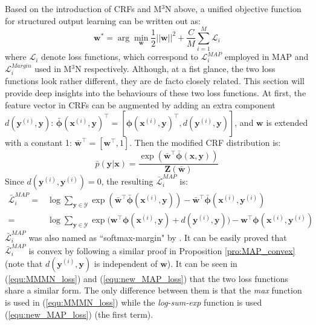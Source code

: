 Based on the introduction of CRFs and M$^3$N above, a unified objective function for structured output learning  can be written out as:  
\begin{equation} 
        \mathbf{w}^* = \arg\min_{\mathbf{w}} \frac{1}{2} ||\mathbf{w}||^2+  \frac{C}{M}\sum_{i=1}^M \mathcal{L}_i 
    \label{equ:unify}
\end{equation} 
where $\mathcal{L}_i$ denote loss functions, which correspond to $\mathcal{L}^{MAP}_i$  employed in MAP and $\mathcal{L}^{Margin}_i$ used 
in M$^3$N respectively.      
Although, at a fist glance, the two loss functions look rather different, they are de facto closely related. This section will provide deep insights  
into the behaviours of these two loss functions.  
At first, the feature vector in CRFs can be augmented by adding an extra component $d(\mathbf{y}^{(i)},\mathbf{y})$:  
$\bar{\boldsymbol{\phi}}(\mathbf{x}^{(i)},\mathbf{y})^\top=[\boldsymbol{\phi}(\mathbf{x}^{(i)},\mathbf{y})^\top,d(\mathbf{y}^{(i)},\mathbf{y})]$, 
and $\mathbf{w}$ is extended with a constant 1: $\bar{\mathbf{w}}^\top=[\mathbf{w}^\top, 1]$. Then the modified CRF distribution is:
\begin{equation}
    \bar{p}(\mathbf{y}|\mathbf{x})=\frac{\exp(\bar{\mathbf{w}}^\top \bar{\boldsymbol{\phi}}(\mathbf{x,y}))}{\mathbf{Z(\bar{w})}}
\end{equation}
Since $d(\mathbf{y}^{(i)},\mathbf{y}^{(i)})=0$, the resulting $\bar{\mathcal{L}}^{MAP}_i$ is:
\begin{equation}
    \begin{array}{cl}
        \bar{\mathcal{L}}^{MAP}_i      =&\log \sum_{\mathbf{y}\in\mathcal{Y}} \exp(\bar{\mathbf{w}}^\top \bar{\boldsymbol{\phi}}(\mathbf{x}^{(i)},\mathbf{y}))-\bar{\mathbf{w}}^\top \bar{\boldsymbol{\phi}}(\mathbf{x}^{(i)},\mathbf{y}^{(i)}) \\ 
                                       =&\log \sum_{\mathbf{y}\in\mathcal{Y}} \exp\big(\mathbf{w}^\top \boldsymbol{\phi}(\mathbf{x}^{(i)},\mathbf{y})+d(\mathbf{y}^{(i)},\mathbf{y})\big) -\mathbf{w}^\top \boldsymbol{\phi}(\mathbf{x}^{(i)},\mathbf{y}^{(i)}) 
\end{array}
    \label{equ:new_MAP_loss}
\end{equation}
$\bar{\mathcal{L}}^{MAP}_i$ was also named as ``softmax-margin" by \cite{SoftMax}. It can be easily proved that $\bar{\mathcal{L}}^{MAP}_i$ is convex by following a similar proof in {Proposition \ref{pro:MAP_convex}}
(note that $d(\mathbf{y}^{(i)},\mathbf{y})$ is independent of $\mathbf{w}$). It can be seen in (\ref{equ:MMMN_loss}) and (\ref{equ:new_MAP_loss}) that the two loss 
functions share a similar form. The only 
difference between them is that the \emph{max} function is used in (\ref{equ:MMMN_loss}) while the \emph{log-sum-exp} function is used (\ref{equ:new_MAP_loss}) (the first term). 

